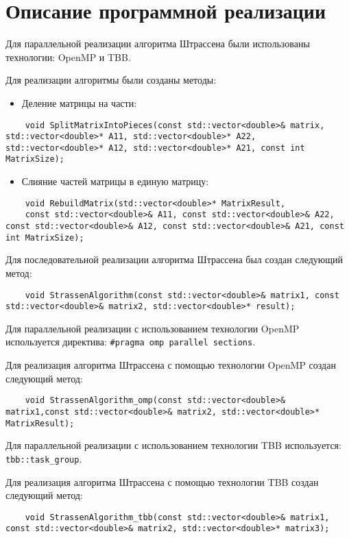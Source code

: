 \documentclass{report}
\begin{document}
\section*{Описание программной реализации}
\par Для параллельной реализации алгоритма Штрассена были использованы технологии: OpenMP и TBB.
\par Для реализации алгоритмы были созданы методы:
\begin{itemize}
\item Деление матрицы на части: 
\end{itemize}
\begin{lstlisting}
	void SplitMatrixIntoPieces(const std::vector<double>& matrix, std::vector<double>* A11, std::vector<double>* A22, std::vector<double>* A12, std::vector<double>* A21, const int MatrixSize);
\end{lstlisting}
\begin{itemize}
\item Слияние частей матрицы в единую матрицу:
\end{itemize}
\begin{lstlisting}
	void RebuildMatrix(std::vector<double>* MatrixResult,
    const std::vector<double>& A11, const std::vector<double>& A22, const std::vector<double>& A12, const std::vector<double>& A21, const int MatrixSize);
\end{lstlisting}
\par Для последовательной реализации алгоритма Штрассена был создан следующий метод: 
\begin{lstlisting}
    void StrassenAlgorithm(const std::vector<double>& matrix1, const std::vector<double>& matrix2, std::vector<double>* result);
\end{lstlisting}
\par Для параллельной реализации с использованием технологии OpenMP используется директива: 
\verb|#pragma omp parallel sections|. 
\par Для реализация алгоритма Штрассена с помощью технологии OpenMP создан следующий метод:
\begin{lstlisting}
    void StrassenAlgorithm_omp(const std::vector<double>& matrix1,const std::vector<double>& matrix2, std::vector<double>* MatrixResult);
\end{lstlisting}

\par Для параллельной реализации с использованием технологии TBB используется: 
\verb|tbb::task_group|.
\par Для реализация алгоритма Штрассена с помощью технологии TBB создан следующий метод:
\begin{lstlisting}
    void StrassenAlgorithm_tbb(const std::vector<double>& matrix1, const std::vector<double>& matrix2, std::vector<double>* matrix3);
\end{lstlisting}
\end{document}
